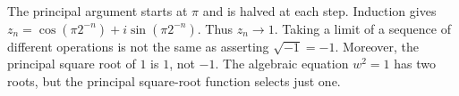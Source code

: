 The principal argument starts at $\pi$ and is halved at each step. Induction gives $z_n=\cos(\pi 2^{-n})+i\sin(\pi 2^{-n})$. Thus $z_n\to1$. Taking a limit of a sequence of different operations is not the same as asserting $\sqrt{-1}=-1$. Moreover, the principal square root of $1$ is $1$, not $-1$. The algebraic equation $w^2=1$ has two roots, but the principal square-root function selects just one.
